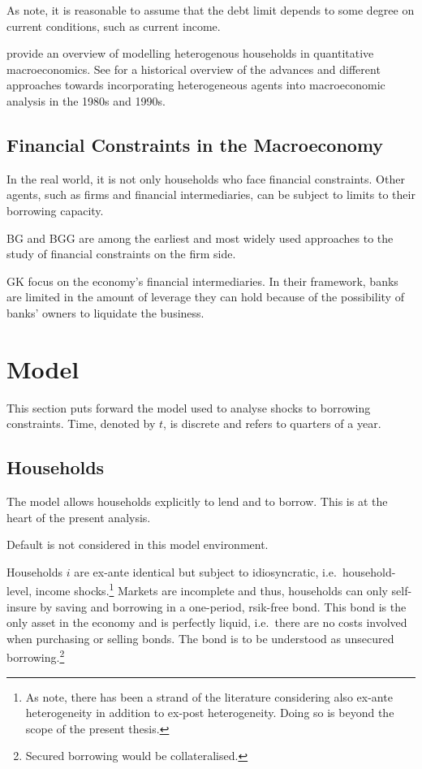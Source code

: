 \documentclass[12pt]{article}
\numberwithin{equation}{section} %
\begin{document}
As \textcite{egg2012} note, it is reasonable to assume that the debt limit depends to some degree on current conditions, such as current income.

\textcite{heath2009} provide an overview of modelling heterogenous households in quantitative macroeconomics. See \textcite{cherrier2023} for a historical overview of the advances and different approaches towards incorporating heterogeneous agents into macroeconomic analysis in the 1980s and 1990s.

\subsection{Financial Constraints in the Macroeconomy}
\label{sec:literature-finance}

In the real world, it is not only households who face financial constraints. Other agents, such as firms and financial intermediaries, can be subject to limits to their borrowing capacity.

BG and BGG are among the earliest and most widely used approaches to the study of financial constraints on the firm side.

GK focus on the economy's financial intermediaries. In their framework, banks are limited in the amount of leverage they can hold because of the possibility of banks' owners to liquidate the business.

\section{Model}
\label{sec:model}

This section puts forward the model used to analyse shocks to borrowing constraints. Time, denoted by $t$, is discrete and refers to quarters of a year.

\subsection{Households}
\label{sec:model-hh}

The model allows households explicitly to lend and to borrow. This is at the heart of the present analysis.

Default is not considered in this model environment.

Households $i$ are ex-ante identical but subject to idiosyncratic, i.e.~household-level, income shocks.\footnote{As \textcite{cherrier2023} note, there has been a strand of the literature considering also ex-ante heterogeneity in addition to ex-post heterogeneity. Doing so is beyond the scope of the present thesis.} Markets are incomplete and thus, households can only self-insure by saving and borrowing in a one-period, rsik-free bond. This bond is the only asset in the economy and is perfectly liquid, i.e.~there are no costs involved when purchasing or selling bonds. The bond is to be understood as unsecured borrowing.\footnote{Secured borrowing would be collateralised.}
\end{document}
